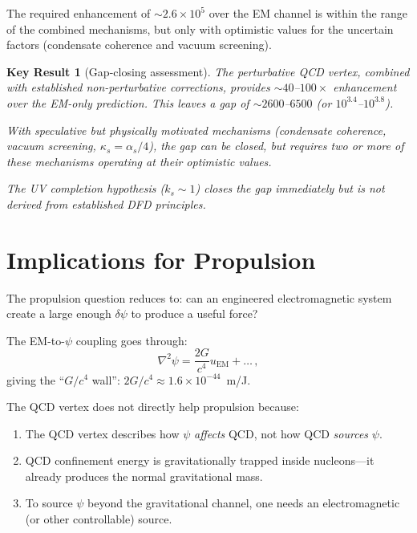 \documentclass[aps,prd,twocolumn,superscriptaddress,floatfix,nofootinbib]{revtex4-2}
\newcommand{\kap}{\kappa}
\newcommand{\as}{\alpha_s}
\newcommand{\ks}{k_s}
\newcommand{\dpsi}{\delta\psi}
\newtheorem{result}{Key Result}
\begin{document}
The required enhancement of $\sim 2.6 \times 10^5$ over the EM channel is
within the range of the combined mechanisms, but only with optimistic values
for the uncertain factors (condensate coherence and vacuum screening).

\begin{result}[Gap-closing assessment]
The perturbative QCD vertex, combined with established non-perturbative
corrections, provides $\sim 40$--$100 \times$ enhancement over the
EM-only prediction. This leaves a gap of $\sim 2600$--$6500$ (or
$10^{3.4}$--$10^{3.8}$).

With speculative but physically motivated mechanisms (condensate coherence,
vacuum screening, $\kap_s = \as/4$), the gap can be closed, but requires
two or more of these mechanisms operating at their optimistic values.

The UV completion hypothesis ($\ks \sim 1$) closes the gap immediately but
is not derived from established DFD principles.
\end{result}


\section{Implications for Propulsion}\label{sec:propulsion}

The propulsion question reduces to: can an engineered electromagnetic system
create a large enough $\dpsi$ to produce a useful force?

The EM-to-$\psi$ coupling goes through:
\begin{equation}
\nabla^2\psi = \frac{2G}{c^4} u_{\mathrm{EM}} + \ldots \, ,
\end{equation}
giving the ``$G/c^4$ wall'': $2G/c^4 \approx 1.6 \times 10^{-44}$~m/J.

The QCD vertex does not directly help propulsion because:
\begin{enumerate}
\item The QCD vertex describes how $\psi$ \emph{affects} QCD, not how QCD
\emph{sources} $\psi$.
\item QCD confinement energy is gravitationally trapped inside nucleons---it
already produces the normal gravitational mass.
\item To source $\psi$ beyond the gravitational channel, one needs an
electromagnetic (or other controllable) source.
\end{enumerate}
\end{document}
